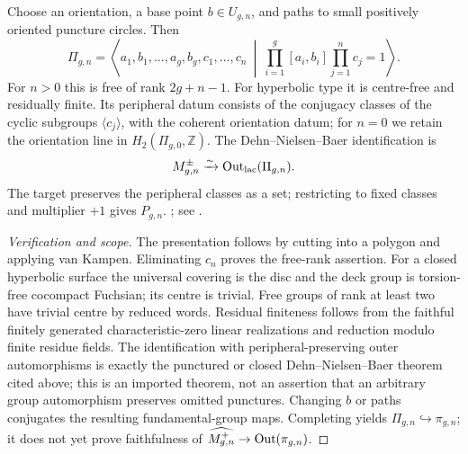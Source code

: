 Choose an orientation, a base point $b\in U_{g,n}$, and paths to small positively oriented puncture circles. Then
\[
\Pi_{g,n}=\left\langle a_1,b_1,\ldots,a_g,b_g,c_1,\ldots,c_n\ \middle|\
 \prod_{i=1}^g[a_i,b_i]\prod_{j=1}^nc_j=1\right\rangle.
\]
For $n>0$ this is free of rank $2g+n-1$. For hyperbolic type it is centre-free and residually finite. Its peripheral datum consists of the conjugacy classes of the cyclic subgroups $\langle c_j\rangle$, with the coherent orientation datum; for $n=0$ we retain the orientation line in $H_2(\Pi_{g,0},\mathbb Z)$. The Dehn--Nielsen--Baer identification is
\[
 M^{\pm}_{g,n}\xrightarrow{\sim}\operatorname{Out}_{\mathrm{lac}}(\Pi_{g,n}).
\]
The target preserves the peripheral classes as a set; restricting to fixed classes and multiplier $+1$ gives $P_{g,n}$.
\Man{19}{111--113}{221--226}; see \citet[Theorems 8.1 and 8.8]{AF_FarbMargalit2012}.
\begin{proof}[Verification and scope]
The presentation follows by cutting into a polygon and applying van Kampen. Eliminating $c_n$ proves the free-rank assertion. For a closed hyperbolic surface the universal covering is the disc and the deck group is torsion-free cocompact Fuchsian; its centre is trivial. Free groups of rank at least two have trivial centre by reduced words. Residual finiteness follows from the faithful finitely generated characteristic-zero linear realizations and reduction modulo finite residue fields. The identification with peripheral-preserving outer automorphisms is exactly the punctured or closed Dehn--Nielsen--Baer theorem cited above; this is an imported theorem, not an assertion that an arbitrary group automorphism preserves omitted punctures. Changing $b$ or paths conjugates the resulting fundamental-group maps. Completing yields $\Pi_{g,n}\hookrightarrow\pi_{g,n}$; it does not yet prove faithfulness of $\widehat{M^+_{g,n}}\to\operatorname{Out}(\pi_{g,n})$.
\end{proof}


